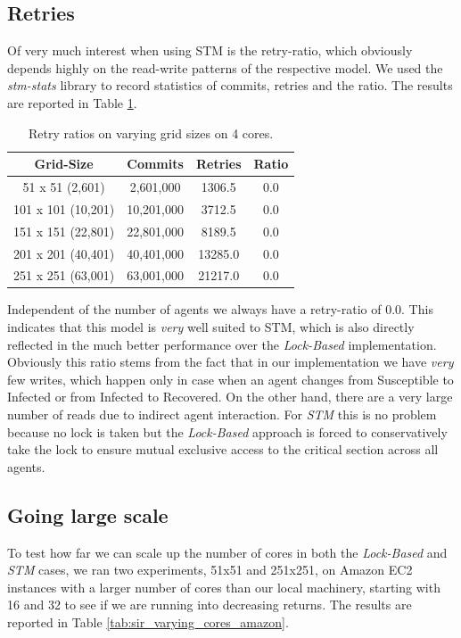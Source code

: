 \subsection{Retries}
Of very much interest when using STM is the retry-ratio, which obviously depends highly on the read-write patterns of the respective model. We used the \textit{stm-stats} library to record statistics of commits, retries and the ratio. The results are reported in Table \ref{tab:retries_stm}.

\begin{table}
	\centering
  	\begin{tabular}{ c || c | c | c }
        Grid-Size 		   & Commits    & Retries & Ratio \\ \hline \hline 
   		51 x 51 (2,601)    & 2,601,000  & 1306.5  & 0.0 \\ \hline
   		101 x 101 (10,201) & 10,201,000 & 3712.5  & 0.0 \\ \hline
   		151 x 151 (22,801) & 22,801,000 & 8189.5  & 0.0 \\ \hline
   		201 x 201 (40,401) & 40,401,000 & 13285.0 & 0.0 \\ \hline 
   		251 x 251 (63,001) & 63,001,000 & 21217.0 & 0.0 \\ \hline \hline
  	\end{tabular}
  	
  	\caption{Retry ratios on varying grid sizes on 4 cores.}
	\label{tab:retries_stm}
\end{table}

Independent of the number of agents we always have a retry-ratio of 0.0. This indicates that this model is \textit{very} well suited to STM, which is also directly reflected in the much better performance over the \textit{Lock-Based} implementation. Obviously this ratio stems from the fact that in our implementation we have \textit{very} few writes, which happen only in case when an agent changes from Susceptible to Infected or from Infected to Recovered. On the other hand, there are a very large number of reads due to indirect agent interaction. For \textit{STM} this is no problem because no lock is taken but the \textit{Lock-Based} approach is forced to conservatively take the lock to ensure mutual exclusive access to the critical section across all agents.

\subsection{Going large scale}
To test how far we can scale up the number of cores in both the \textit{Lock-Based} and \textit{STM} cases, we ran two experiments, 51x51 and 251x251, on Amazon EC2 instances with a larger number of cores than our local machinery, starting with 16 and 32 to see if we are running into decreasing returns. The results are reported in Table \ref{tab:sir_varying_cores_amazon}.

